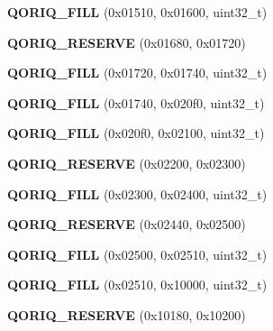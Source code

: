 \begin{DoxyCompactItemize}
{\bfseries Q\+O\+R\+I\+Q\+\_\+\+F\+I\+LL} (0x01510, 0x01600, uint32\+\_\+t)
\item 
\mbox{\label{structqoriq__pic_a4f71f6baf6f0b5968c67e39344af75be}} 
{\bfseries Q\+O\+R\+I\+Q\+\_\+\+R\+E\+S\+E\+R\+VE} (0x01680, 0x01720)
\item 
\mbox{\label{structqoriq__pic_afd6db15acf5f28e85d8a0606038d7e94}} 
{\bfseries Q\+O\+R\+I\+Q\+\_\+\+F\+I\+LL} (0x01720, 0x01740, uint32\+\_\+t)
\item 
\mbox{\label{structqoriq__pic_af4f3782a613c7b99db6221588636a9ab}} 
{\bfseries Q\+O\+R\+I\+Q\+\_\+\+F\+I\+LL} (0x01740, 0x020f0, uint32\+\_\+t)
\item 
\mbox{\label{structqoriq__pic_a53bea497c30c37df6d49dccd4128388e}} 
{\bfseries Q\+O\+R\+I\+Q\+\_\+\+F\+I\+LL} (0x020f0, 0x02100, uint32\+\_\+t)
\item 
\mbox{\label{structqoriq__pic_ac1fc28b7030509447b59f7248d93eeba}} 
{\bfseries Q\+O\+R\+I\+Q\+\_\+\+R\+E\+S\+E\+R\+VE} (0x02200, 0x02300)
\item 
\mbox{\label{structqoriq__pic_af73408fa7c067dafa297e309f25515cf}} 
{\bfseries Q\+O\+R\+I\+Q\+\_\+\+F\+I\+LL} (0x02300, 0x02400, uint32\+\_\+t)
\item 
\mbox{\label{structqoriq__pic_adeaf514bb2e0355eac3621ee1b6fc2d4}} 
{\bfseries Q\+O\+R\+I\+Q\+\_\+\+R\+E\+S\+E\+R\+VE} (0x02440, 0x02500)
\item 
\mbox{\label{structqoriq__pic_a23f16a4c62a6fd3a349642208987facc}} 
{\bfseries Q\+O\+R\+I\+Q\+\_\+\+F\+I\+LL} (0x02500, 0x02510, uint32\+\_\+t)
\item 
\mbox{\label{structqoriq__pic_ae9e4d1de74b397902bae99a0d802eab5}} 
{\bfseries Q\+O\+R\+I\+Q\+\_\+\+F\+I\+LL} (0x02510, 0x10000, uint32\+\_\+t)
\item 
\mbox{\label{structqoriq__pic_aaa4968bc94b17909dad54fa2a92ef6d2}} 
{\bfseries Q\+O\+R\+I\+Q\+\_\+\+R\+E\+S\+E\+R\+VE} (0x10180, 0x10200)
\item 

\end{DoxyCompactItemize}
